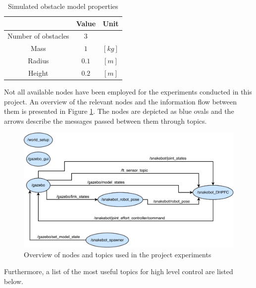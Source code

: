 \begin{table}[]
    \centering
    \begin{tabular}{|c|c|c|}
        \hline
        & Value & Unit\\
        \hline
        Number of obstacles & $3$ & \\
        Mass & $1$ & $[kg]$ \\
        Radius & $0.1$ & $[m]$ \\
        Height & $0.2$ & $[m]$ \\
        \hline
    \end{tabular}
    \caption{Simulated obstacle model properties}
    \label{tab:obst_model_props}
\end{table}

Not all available nodes have been employed for the experiments conducted in this project. An overview of the relevant nodes and the information flow between them is presented in Figure \ref{fig:proj_nodes}. The nodes are depicted as blue ovals and the arrows describe the messages passed between them through topics.

\begin{figure}
    \centering
    \includegraphics[width=1\textwidth]{figures/simulator/proj_nodes.pdf}
    \caption{Overview of nodes and topics used in the project experiments}
    \label{fig:proj_nodes}
\end{figure}

Furthermore, a list of the most useful topics for high level control are listed below.

